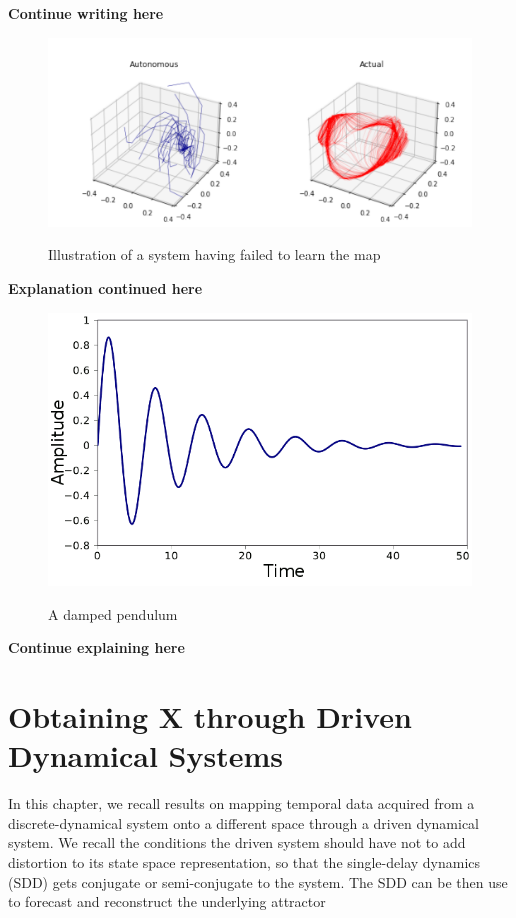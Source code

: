\documentclass[12 pt]{article}
\begin{document}
\textbf{Continue writing here}


\begin{figure}[ht]
  \includegraphics[scale=0.3]{learningfailure.png}
  \centering
  \label{fig:supp_learning_failure}
  \caption{Illustration of a system having failed to learn the map}
\end{figure}


\textbf{Explanation continued here}

\begin{figure}[h]
  \includegraphics[scale=0.4]{temporary_damp_fig.png}
  \centering
  \label{fig:damped_pendulum}
\caption{A damped pendulum}
\end{figure}

\textbf{Continue explaining here}


\section{Obtaining X through Driven Dynamical Systems}

In this chapter, we recall results on mapping temporal data acquired from a discrete-dynamical system onto a different space through a driven dynamical system. We recall the conditions the driven system should have not to add distortion to its state space representation, so that the single-delay dynamics (SDD) gets conjugate or semi-conjugate to the system. The SDD can be then use to forecast and reconstruct the underlying attractor
\end{document}
